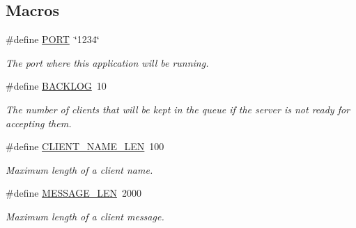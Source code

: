 \subsection*{Macros}
\begin{DoxyCompactItemize}
\item 
\#define \hyperlink{zip-zop-server_8c_a614217d263be1fb1a5f76e2ff7be19a2}{P\+O\+RT}~\char`\"{}1234\char`\"{}
\begin{DoxyCompactList}\small\item\em The port where this application will be running. \end{DoxyCompactList}\item 
\#define \hyperlink{zip-zop-server_8c_aeefbbafa97642defe3ee6c3080b7d66f}{B\+A\+C\+K\+L\+OG}~10
\begin{DoxyCompactList}\small\item\em The number of clients that will be kept in the queue if the server is not ready for accepting them. \end{DoxyCompactList}\item 
\#define \hyperlink{zip-zop-server_8c_a2966c973ff2fbc59d762420ad283e82f}{C\+L\+I\+E\+N\+T\+\_\+\+N\+A\+M\+E\+\_\+\+L\+EN}~100
\begin{DoxyCompactList}\small\item\em Maximum length of a client name. \end{DoxyCompactList}\item 
\#define \hyperlink{zip-zop-server_8c_aa2dfc63100e2bed7efb1b0cd09dea107}{M\+E\+S\+S\+A\+G\+E\+\_\+\+L\+EN}~2000
\begin{DoxyCompactList}\small\item\em Maximum length of a client message. \end{DoxyCompactList}\end{DoxyCompactItemize}
